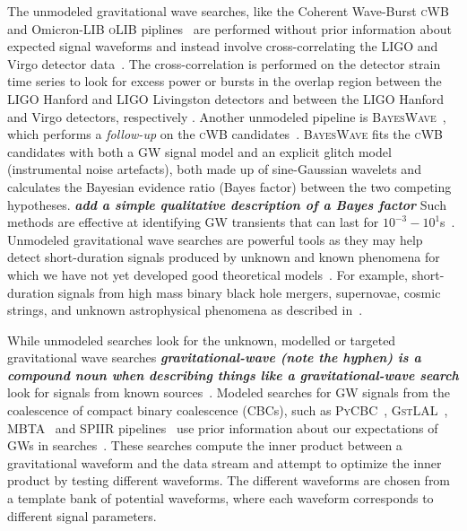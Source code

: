 The unmodeled gravitational wave searches, like the Coherent Wave-Burst \textsc{cWB}~\cite{cWB_search} and Omicron-LIB \textsc{oLIB} piplines~\cite{oLIB} are performed without prior information about expected signal waveforms and instead involve cross-correlating the LIGO and Virgo detector data~\cite{gw_search_review}.
The cross-correlation is performed on the detector strain time series to look for excess power or bursts in the overlap region between the LIGO Hanford and LIGO Livingston detectors and between the LIGO Hanford and Virgo detectors, respectively \cite{gw_search_review}. 
Another unmodeled pipeline is \textsc{BayesWave}~\cite{Cornish:2015:CQGra}, which performs a \textit{follow-up} on the \textsc{cWB} candidates~\cite{bayeswave_as_followup, abbott2019all}. 
\textsc{BayesWave} fits the \textsc{cWB} candidates with both a GW signal model and an explicit glitch model (instrumental noise artefacts), both made up of sine-Gaussian wavelets and calculates the Bayesian evidence ratio (Bayes factor) between the two competing hypotheses. \textit{\textbf{add a simple qualitative description of a Bayes factor}}
Such methods are effective at identifying GW transients that can last for
$10^{-3}-10^{1}$s~\cite{abbott2016observing}. 
Unmodeled gravitational wave searches are powerful tools as they may help detect short-duration signals produced by unknown and known phenomena for which we have not yet developed good theoretical models~\cite{gw_search_review}. 
For example, short-duration signals from high mass binary black hole mergers, supernovae, cosmic strings, and unknown astrophysical phenomena as described in~\citep{abbott2018prospects}.

While unmodeled searches look for the unknown,  modelled or targeted gravitational wave searches \textit{\textbf{gravitational-wave (note the hyphen) is a compound noun when describing things like a gravitational-wave search}} look for signals from known sources~\cite{abbott2016ligo}. 
Modeled searches for GW signals from the coalescence of compact binary coalescence (CBCs), such as \textsc{PyCBC}~\cite{biwer2019pycbc},
\textsc{GstLAL}~\cite{sachdev2019gstlal}, \textsc{MBTA}~\cite{MBTA} and \textsc{SPIIR} pipelines~\cite{SPIIR} use prior information about our expectations of GWs in searches~\cite{gw_search_review}. These searches compute the inner product between a gravitational waveform and the data stream and attempt to optimize the inner product by testing different waveforms. 
The different waveforms are chosen from a template bank of potential waveforms, where each waveform corresponds to different signal parameters. 

